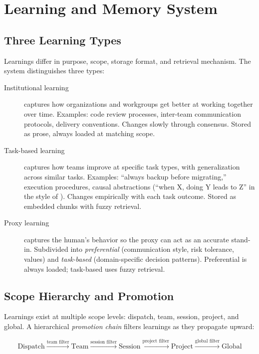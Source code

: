 \documentclass[11pt,a4paper]{article}
\begin{document}
\section{Learning and Memory System}
\label{sec:learning}

\subsection{Three Learning Types}

Learnings differ in purpose, scope, storage format, and retrieval
mechanism. The system distinguishes three types:

\begin{description}
    \item[Institutional learning] captures how organizations and
    workgroups get better at working together over time. Examples:
    code review processes, inter-team communication protocols,
    delivery conventions. Changes slowly through consensus.
    Stored as prose, always loaded at matching scope.

    \item[Task-based learning] captures how teams improve at specific
    task types, with generalization across similar tasks. Examples:
    ``always backup before migrating,'' execution procedures,
    causal abstractions (``when X, doing Y leads to Z'' in the
    style of \citet{majumder2024clin}). Changes empirically with
    each task outcome. Stored as embedded chunks with fuzzy retrieval.

    \item[Proxy learning] captures the human's behavior so the proxy
    can act as an accurate stand-in. Subdivided into
    \emph{preferential} (communication style, risk tolerance, values)
    and \emph{task-based} (domain-specific decision patterns).
    Preferential is always loaded; task-based uses fuzzy retrieval.
\end{description}

\subsection{Scope Hierarchy and Promotion}

Learnings exist at multiple scope levels: dispatch, team, session,
project, and global. A hierarchical \emph{promotion chain} filters
learnings as they propagate upward:

\begin{equation*}
\text{Dispatch} \xrightarrow{\text{team filter}}
\text{Team} \xrightarrow{\text{session filter}}
\text{Session} \xrightarrow{\text{project filter}}
\text{Project} \xrightarrow{\text{global filter}}
\text{Global}
\end{equation*}
\end{document}
